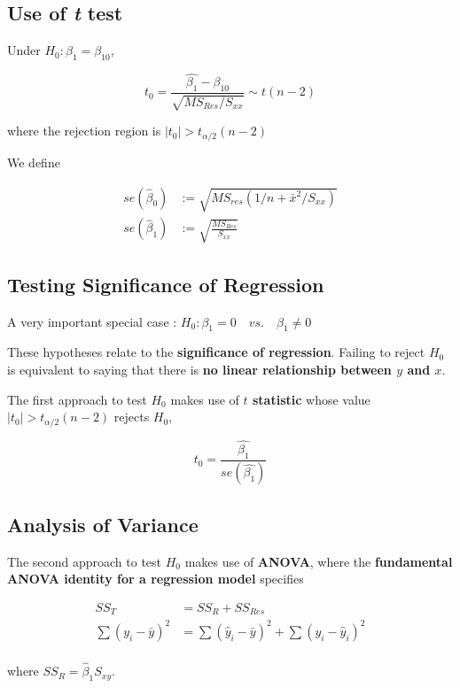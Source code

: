 \documentclass[12pt]{article}
\begin{document}
\subsection{Use of \textit{t} test}

Under $H_0 : \beta_1 = \beta_{10}$,

$$
t_0 = \frac{\hat{\beta_1} - \beta_{10}}{\sqrt{MS_{Res} /S_{xx}}} \sim t(n-2)
$$

where the rejection region is $|t_0| > t_{\alpha/2} (n-2)$

We define

$$
\begin{aligned}
se(\hat{\beta}_0) &:= \sqrt{MS_{res} (1/n + \bar{x}^2 / S_{xx})} \\[10pt]
se(\hat{\beta}_1) &:= \sqrt{\frac{MS_{Res}}{S_{xx}}}
\end{aligned}
$$


\subsection{Testing Significance of Regression}

A very important special case : $H_0 : \beta_1 = 0 \quad vs. \quad \beta_1 \neq 0$

These hypotheses relate to the \textbf{significance of regression}. Failing to reject $H_0$ is equivalent to saying that there is \textbf{no linear relationship between $y$ and $x$}.

The first approach to test $H_0$ makes use of \textbf{$t$ statistic} whose value $|t_0| > t_{\alpha/2}(n-2)$ rejects $H_0$,

$$
t_0 = \frac{\hat{\beta_1}}{se\left(\hat{\beta_1} \right)}
$$

\subsection{Analysis of Variance}

The second approach to test $H_0$ makes use of \textbf{ANOVA}, where the \textbf{fundamental ANOVA identity for a regression model} specifies

$$
\begin{aligned}
SS_T &= SS_R + SS_{Res}\\[10pt]
\sum (y_i - \bar{y})^2 &= \sum(\hat{y}_i - \bar{y})^2 + \sum (y_i - \hat{y}_i)^2 \\
\end{aligned}
$$

where $SS_R = \hat{\beta}_1 S_{xy}$. 
\end{document}
